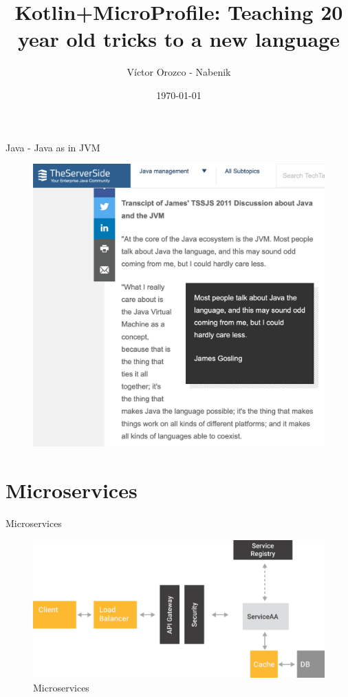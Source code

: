 \documentclass[aspectratio=169]{beamer}
\title{Kotlin+MicroProfile: Teaching 20 year old tricks to a new language }
\author{Víctor Orozco - Nabenik}
\institute{@tuxtor}
\date{\today}
\begin{document}
\frame{\titlepage}


\begin{frame}{Java - Java as in JVM}

		\begin{figure}
			\centering
			\includegraphics[width=0.7\linewidth]{Images/gossling}
		\end{figure}
\end{frame}


\section{Microservices}

\begin{frame}{Microservices}
\begin{figure}
\centering
\includegraphics[width=0.7\linewidth]{Images/microservicios}
\caption{Microservices}
\end{figure}
\end{frame}
\end{document}
